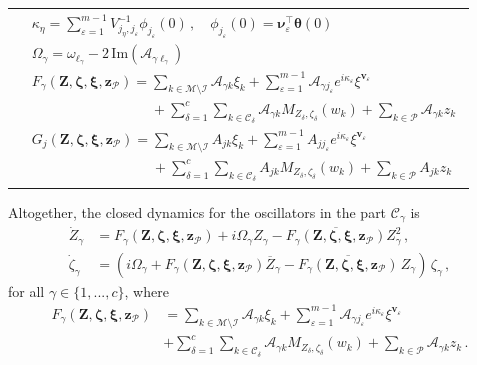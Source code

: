 \documentclass[aps,pre,reprint,longbibliography,superscriptaddress,noshowpacs,floatfix]{revtex4-2}
\theoremstyle{definition}
\theoremstyle{remark}
\begin{document}
\begin{table}[t]
\begin{ruledtabular}
\begin{tabular}{ c }
{\begin{align*}
&\kappa_{\eta}  = \sum_{\varepsilon = 1}^{m-1}V^{-1}_{j_\eta, j_\varepsilon}\phi_{j_\varepsilon}(0)\,,\quad \phi_{j_\varepsilon}(0) = \bm\nu_\varepsilon^\top \bm{\theta}(0)\\
    &\Omega_{\gamma} = \omega_{\ell_{\gamma}} - 2\,\mathrm{Im}(\mathcal{A}_{\gamma \ell_{\gamma}})\\
    &F_{\gamma}(\bm{Z}, \bm{\zeta}, \bm{\xi}, \bm{z}_{\mathcal{P}}) = \sum_{k\in\mathcal{M}\setminus\mathcal{I}}\mathcal{A}_{\gamma k}\xi_k + \sum_{\varepsilon = 1}^{m-1} \mathcal{A}_{\gamma j_\varepsilon} e^{i\kappa_\varepsilon}\xi^{\bm{v}_\varepsilon} \\&\phantom{F_{\gamma}(\bm{Z}, \bm{\zeta}, \bm{\xi}, \bm{z}_{\mathcal{P}}) =}+ \sum_{\delta=1}^c \sum_{k\in \mathcal{C}_\delta} \mathcal{A}_{\gamma k}M_{Z_{\delta}, \zeta_{\delta}}(w_k) + \sum_{k\in \mathcal{P}} \mathcal{A}_{\gamma k}z_k\\
    &G_{j}(\bm{Z}, \bm{\zeta}, \bm{\xi}, \bm{z}_{\mathcal{P}}) = \sum_{k\in\mathcal{M}\setminus\mathcal{I}}A_{j k}\xi_k + \sum_{\varepsilon = 1}^{m-1} A_{j j_\varepsilon}e^{i\kappa_\varepsilon}\xi^{\bm{v}_\varepsilon}\\ &\phantom{G_{j}(\bm{Z}, \bm{\zeta}, \bm{\xi}, \bm{z}_{\mathcal{P}}) = }+ \sum_{\delta =1}^c\sum_{k\in \mathcal{C}_\delta} A_{j k}M_{Z_{\delta}, \zeta_{\delta}}(w_k) + \sum_{k\in \mathcal{P}}A_{j k}z_k 
\end{align*}}


\end{tabular}
\end{ruledtabular}
\end{table}

Altogether, the closed dynamics for the oscillators in the part $\mathcal{C}_\gamma$ is
 \begin{align*}
    \dot{Z}_{\gamma} &= F_{\gamma}(\bm{Z}, \bm{\zeta}, \bm{\xi}, \bm{z}_{\mathcal{P}}) + i\Omega_{\gamma} Z_{\gamma} - \overline{F_{\gamma}(\bm{Z}, \bm{\zeta}, \bm{\xi}, \bm{z}_{\mathcal{P}})}Z_{\gamma}^2\,, \\%
    \dot{\zeta}_{\gamma} &= (i\Omega_{\gamma} + F_{\gamma}(\bm{Z}, \bm{\zeta}, \bm{\xi}, \bm{z}_{\mathcal{P}})\overline{Z}_{\gamma} - \overline{F_{\gamma}(\bm{Z}, \bm{\zeta}, \bm{\xi}, \bm{z}_{\mathcal{P}})}\,Z_{\gamma})\,\zeta_{\gamma}\,,%
\end{align*}
for all $\gamma\in\{1,...,c\}$, where
\begin{align*}
    F_{\gamma}(\bm{Z}, \bm{\zeta}, \bm{\xi}, \bm{z}_{\mathcal{P}}) &= \sum_{k\in\mathcal{M}\setminus\mathcal{I}}\mathcal{A}_{\gamma k}\xi_k + \sum_{\varepsilon = 1}^{m-1} \mathcal{A}_{\gamma j_\varepsilon}e^{i\kappa_\varepsilon}\xi^{\bm{v}_\varepsilon}\\&+ \sum_{\delta=1}^c \sum_{k\in \mathcal{C}_\delta} \mathcal{A}_{\gamma k}M_{Z_{\delta}, \zeta_{\delta}}(w_k) + \sum_{k\in \mathcal{P}} \mathcal{A}_{\gamma k}z_k\,.
\end{align*}
\end{document}

